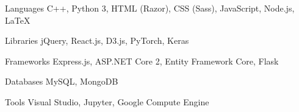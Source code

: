 

\begin{cvskills}

  \cvskill
    {Languages} %
    {C++, Python 3, HTML (Razor), CSS (Sass), JavaScript, Node.js, LaTeX} %

  \cvskill
    {Libraries} %
    {jQuery, React.js, D3.js, PyTorch, Keras} %

  \cvskill
    {Frameworks} %
    {Express.js, ASP.NET Core 2, Entity Framework Core, Flask} %

  \cvskill
    {Databases} %
    {MySQL, MongoDB} %
    
  \cvskill
    {Tools} %
    {Visual Studio, Jupyter, Google Compute Engine} %

\end{cvskills}
